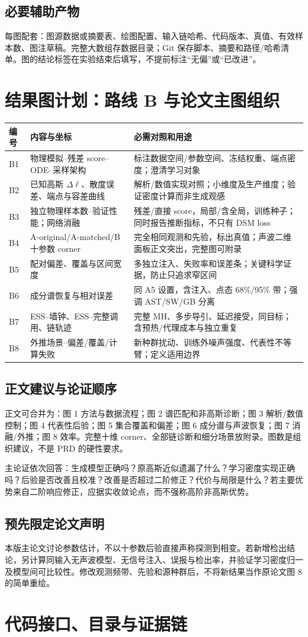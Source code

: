\documentclass[UTF8,fontset=none,a4paper,11pt]{ctexart}
\newcommand{\chapterpage}[1]{\section{#1}}
\begin{document}
\subsection{必要辅助产物}
每图配套：图源数据或摘要表、绘图配置、输入链哈希、代码版本、真值、有效样本数、图注草稿。完整大数组存数据目录；Git 保存脚本、摘要和路径/哈希清单。图的结论标签在实验结束后填写，不提前标注“无偏”或“已改进”。
\clearpage\chapterpage{结果图计划：路线 B 与论文主图组织}
\begin{longtable}{p{12mm}p{58mm}p{75mm}}\toprule
编号 & 内容与坐标 & 必需对照和用途\\\midrule\endhead
B1 & 物理模拟--残差 score--ODE--采样架构 & 标注数据空间/参数空间、冻结权重、端点密度；澄清学习对象\\
B2 & 已知高斯 $\Delta\ell$、散度误差、端点与容差曲线 & 解析/数值实现对照；小维度及生产维度；验证密度计算而非生成观感\\
B3 & 独立物理样本数--验证性能；网络消融 & 残差/直接 score，局部/含全局，训练种子；同时报告推断指标，不只有 DSM loss\\
B4 & A-original/A-matched/B 十参数 corner & 完全相同观测和先验，标出真值；声波二维面板正文突出，完整图可附录\\
B5 & 配对偏差、覆盖与区间宽度 & 多独立注入、失败率和误差条；关键科学证据，防止只追求窄区间\\
B6 & 成分谱恢复与相对误差 & 同 A5 设置，含注入、点态 68\%/95\% 带；强调 AST/SW/GB 分离\\
B7 & ESS--墙钟、ESS--完整调用、链轨迹 & 完整 MH、多步导引、延迟接受，同目标；含预热/代理成本与独立重复\\
B8 & 外推场景--偏差/覆盖/计算失败 & 新种群扰动、训练外噪声强度、代表性不等臂；定义适用边界\\\bottomrule
\end{longtable}
\subsection{正文建议与论证顺序}
正文可合并为：图 1 方法与数据流程；图 2 谱匹配和非高斯诊断；图 3 解析/数值控制；图 4 代表性后验；图 5 集合覆盖和偏差；图 6 成分谱与声波恢复；图 7 消融/外推；图 8 效率。完整十维 corner、全部链诊断和细分场景放附录。图数是组织建议，不是 PRD 的硬性要求。
\par 主论证依次回答：生成模型正确吗？原高斯近似遗漏了什么？学习密度实现正确吗？后验是否改善且校准？改善是否超过二阶修正？代价与局限是什么？若主要优势来自二阶响应修正，应据实收敛论点，而不强称高阶非高斯优势。
\subsection{预先限定论文声明}
本版主论文讨论参数估计，不以十参数后验直接声称探测到相变。若新增检出结论，另计算同输入无声波模型、无信号注入、误报与检出率，并验证学习密度归一及模型间可比较性。修改观测频带、先验和源种群后，不将新结果当作原论文图 8 的简单重绘。
\chapterpage{代码接口、目录与证据链}
\end{document}
